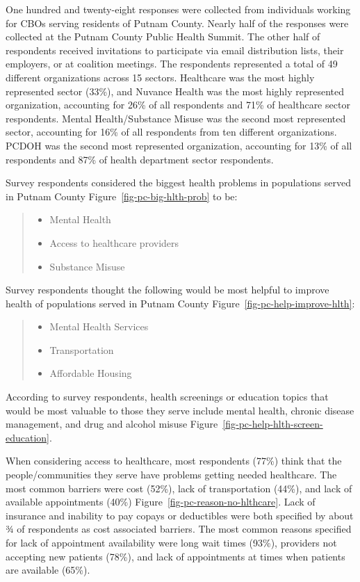 \documentclass[
  english,
  letterpaper,
]{report}
\begin{document}
One hundred and twenty-eight responses were collected from individuals
working for CBOs serving residents of Putnam County. Nearly half of the
responses were collected at the Putnam County Public Health Summit. The
other half of respondents received invitations to participate via email
distribution lists, their employers, or at coalition meetings. The
respondents represented a total of 49 different organizations across 15
sectors. Healthcare was the most highly represented sector (33\%), and
Nuvance Health was the most highly represented organization, accounting
for 26\% of all respondents and 71\% of healthcare sector respondents.
Mental Health/Substance Misuse was the second most represented sector,
accounting for 16\% of all respondents from ten different organizations.
PCDOH was the second most represented organization, accounting for 13\%
of all respondents and 87\% of health department sector respondents.

Survey respondents considered the biggest health problems in populations
served in Putnam County Figure~\ref{fig-pc-big-hlth-prob} to be:

\begin{quote}
\begin{itemize}
\item
  Mental Health
\item
  Access to healthcare providers
\item
  Substance Misuse
\end{itemize}
\end{quote}

Survey respondents thought the following would be most helpful to
improve health of populations served in Putnam County
Figure~\ref{fig-pc-help-improve-hlth}:

\begin{quote}
\begin{itemize}
\item
  Mental Health Services
\item
  Transportation
\item
  Affordable Housing
\end{itemize}
\end{quote}

According to survey respondents, health screenings or education topics
that would be most valuable to those they serve include mental health,
chronic disease management, and drug and alcohol misuse
Figure~\ref{fig-pc-help-hlth-screen-education}.

When considering access to healthcare, most respondents (77\%) think
that the people/communities they serve have problems getting needed
healthcare. The most common barriers were cost (52\%), lack of
transportation (44\%), and lack of available appointments (40\%)
Figure~\ref{fig-pc-reason-no-hlthcare}. Lack of insurance and inability
to pay copays or deductibles were both specified by about ¾ of
respondents as cost associated barriers. The most common reasons
specified for lack of appointment availability were long wait times
(93\%), providers not accepting new patients (78\%), and lack of
appointments at times when patients are available (65\%).
\end{document}
